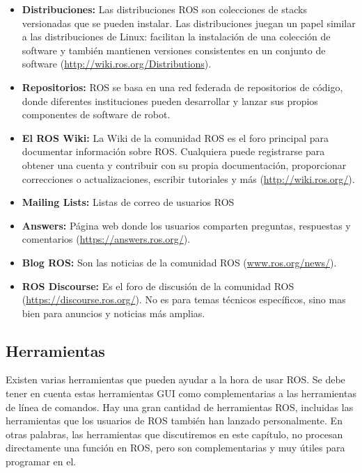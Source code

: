             \begin{itemize}
                \item {\textbf{Distribuciones:} Las distribuciones ROS son colecciones de stacks versionadas que se pueden instalar. Las distribuciones juegan un papel similar a las distribuciones de Linux: facilitan la instalación de una colección de software y también mantienen versiones consistentes en un conjunto de software (\url{http://wiki.ros.org/Distributions}).}
                \item {\textbf{Repositorios:} ROS se basa en una red federada de repositorios de código, donde diferentes instituciones pueden desarrollar y lanzar sus propios componentes de software de robot. }
                \item {\textbf{El ROS Wiki:} La Wiki de la comunidad ROS es el foro principal para documentar información sobre ROS. Cualquiera puede registrarse para obtener una cuenta y contribuir con su propia documentación, proporcionar correcciones o actualizaciones, escribir tutoriales y más (\url{http://wiki.ros.org/}). }
                \item {\textbf{Mailing Lists:} Listas de correo de usuarios ROS}
                \item {\textbf{Answers:} Página web donde los usuarios comparten preguntas, respuestas y comentarios (\url{https://answers.ros.org/}). }
                \item {\textbf{Blog ROS:} Son las noticias de la comunidad ROS (\url{www.ros.org/news/}).}
                \item {\textbf{ROS Discourse:} Es el foro de discusión de la comunidad ROS  (\url{https://discourse.ros.org/}). No es para temas técnicos específicos, sino mas bien para anuncios y noticias más amplias.}
            \end{itemize}
            
            
            
            
               \newpage
               
    \newpage

    \subsection{Herramientas}
    
        Existen varias herramientas que pueden ayudar a la hora de usar ROS. Se debe tener en cuenta estas herramientas GUI como complementarias a las herramientas de línea de comandos. Hay una gran cantidad de herramientas ROS, incluidas las herramientas que los usuarios de ROS también han lanzado personalmente. En otras palabras, las herramientas que discutiremos en este capítulo, no procesan directamente una función en ROS, pero son complementarias y muy útiles para programar en el.
            
